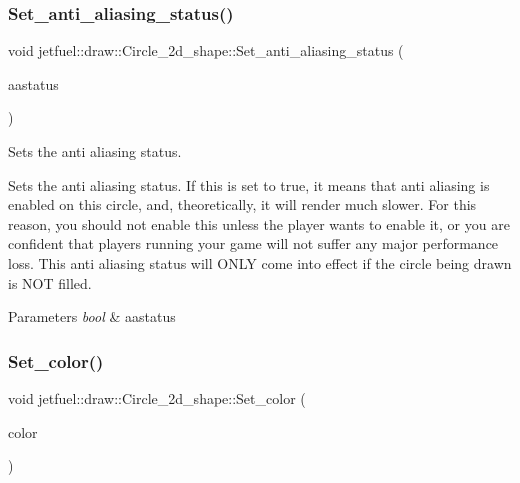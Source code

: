 \subsubsection{\texorpdfstring{Set\+\_\+anti\+\_\+aliasing\+\_\+status()}{Set\_anti\_aliasing\_status()}}
{\footnotesize\ttfamily void jetfuel\+::draw\+::\+Circle\+\_\+2d\+\_\+shape\+::\+Set\+\_\+anti\+\_\+aliasing\+\_\+status (\begin{DoxyParamCaption}\item[{const bool}]{aastatus }\end{DoxyParamCaption})\hspace{0.3cm}{\ttfamily [inline]}}



Sets the anti aliasing status. 

Sets the anti aliasing status. If this is set to true, it means that anti aliasing is enabled on this circle, and, theoretically, it will render much slower. For this reason, you should not enable this unless the player wants to enable it, or you are confident that players running your game will not suffer any major performance loss. This anti aliasing status will O\+N\+LY come into effect if the circle being drawn is N\+OT filled.


\begin{DoxyParams}{Parameters}
{\em bool} & aastatus \\
\hline
\end{DoxyParams}
\mbox{\label{classjetfuel_1_1draw_1_1Circle__2d__shape_a20ac0647e90c629f347e3c65a0315220}} 
\subsubsection{\texorpdfstring{Set\+\_\+color()}{Set\_color()}}
{\footnotesize\ttfamily void jetfuel\+::draw\+::\+Circle\+\_\+2d\+\_\+shape\+::\+Set\+\_\+color (\begin{DoxyParamCaption}\item[{const \hyperlink{classjetfuel_1_1draw_1_1Color}{Color}}]{color }\end{DoxyParamCaption})\hspace{0.3cm}{\ttfamily [inline]}}



